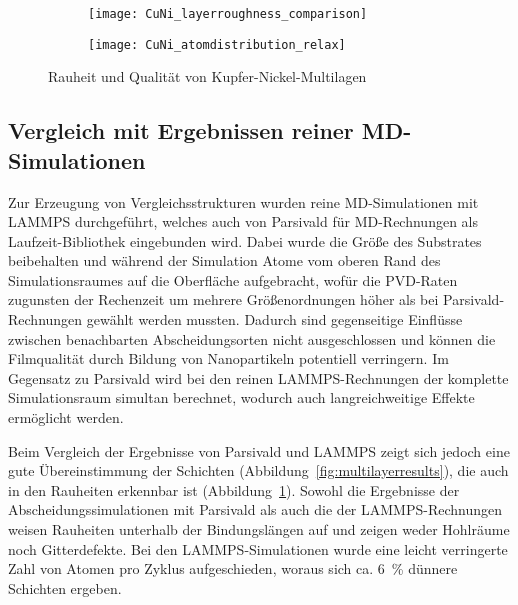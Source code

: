 \begin{figure}[bp]
  \captionsetup[subfigure]{singlelinecheck=false}
  \def\subfigwidth{7cm}
  \begin{subfigure}[t]{\subfigwidth}
    \texttt{[image: CuNi\_layerroughness\_comparison]}
    \label{fig:multilayerplots-a}
  \end{subfigure}
  \hfill
  \begin{subfigure}[t]{\subfigwidth}
    \texttt{[image: CuNi\_atomdistribution\_relax]}
    \label{fig:multilayerplots-b}
  \end{subfigure}
  \caption[Rauheit und Qualität von Kupfer-Nickel-Multilagen]{
    Rauheit und Qualität von Kupfer-Nickel-Multilagen
  }
  \label{fig:multilayerplots}
\end{figure}

\subsection{Vergleich mit Ergebnissen reiner MD-Simulationen}

Zur Erzeugung von Vergleichsstrukturen wurden reine MD-Simulationen mit LAMMPS durchgeführt, welches auch von Parsivald für MD-Rechnungen als Laufzeit-Bibliothek eingebunden wird.
Dabei wurde die Größe des Substrates beibehalten und während der Simulation Atome vom oberen Rand des Simulationsraumes auf die Oberfläche aufgebracht, wofür die PVD-Raten zugunsten der Rechenzeit um mehrere Größenordnungen höher als bei Parsivald-Rechnungen gewählt werden mussten.
Dadurch sind gegenseitige Einflüsse zwischen benachbarten Abscheidungsorten nicht ausgeschlossen und können die Filmqualität durch Bildung von Nanopartikeln potentiell verringern.
Im Gegensatz zu Parsivald wird bei den reinen LAMMPS-Rechnungen der komplette Simulationsraum simultan berechnet, wodurch auch langreichweitige Effekte ermöglicht werden.

Beim Vergleich der Ergebnisse von Parsivald und LAMMPS zeigt sich jedoch eine gute Übereinstimmung der Schichten (Abbildung~\ref{fig:multilayerresults}), die auch in den Rauheiten erkennbar ist (Abbildung~\ref{fig:multilayerplots-a}).
Sowohl die Ergebnisse der Abscheidungssimulationen mit Parsivald als auch die der LAMMPS-Rechnungen weisen Rauheiten unterhalb der Bindungslängen auf und zeigen weder Hohlräume noch Gitterdefekte.
Bei den LAMMPS-Simulationen wurde eine leicht verringerte Zahl von Atomen pro Zyklus aufgeschieden, woraus sich ca. \SI{6}{\percent} dünnere Schichten ergeben.

